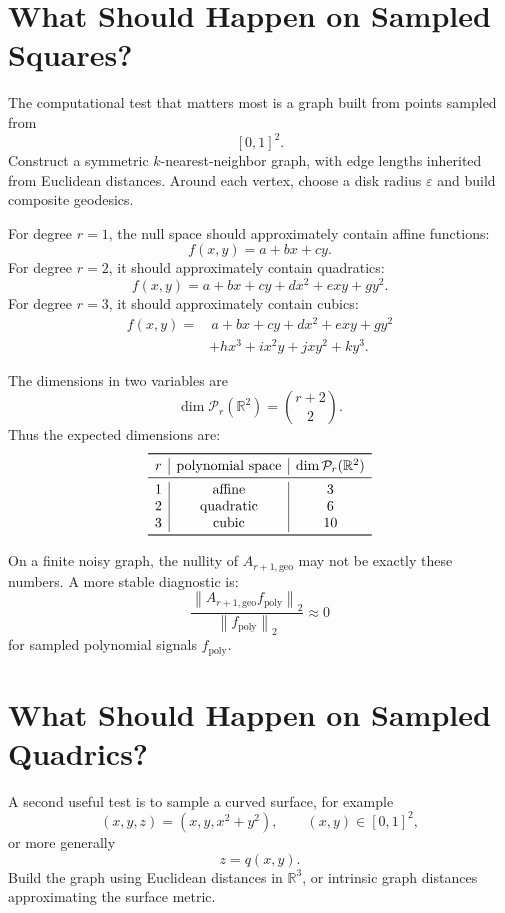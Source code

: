 \documentclass[11pt]{article}
\newcommand{\R}{\mathbb R}
\newcommand{\norm}[1]{\left\lVert #1 \right\rVert}
\newcommand{\eps}{\varepsilon}
\begin{document}
\section{What Should Happen on Sampled Squares?}

The computational test that matters most is a graph built from points sampled
from
\[
  [0,1]^2.
\]
Construct a symmetric \(k\)-nearest-neighbor graph, with edge lengths inherited
from Euclidean distances.  Around each vertex, choose a disk radius \(\eps\)
and build composite geodesics.

For degree \(r=1\), the null space should approximately contain affine
functions:
\[
  f(x,y)=a+bx+cy.
\]
For degree \(r=2\), it should approximately contain quadratics:
\[
  f(x,y)=a+bx+cy+d x^2+e xy+g y^2.
\]
For degree \(r=3\), it should approximately contain cubics:
\[
\begin{split}
  f(x,y)=&\,a+bx+cy+d x^2+e xy+g y^2\\
         &+h x^3+i x^2y+j xy^2+k y^3.
\end{split}
\]

The dimensions in two variables are
\[
  \dim \mathcal P_r(\R^2)=\binom{r+2}{2}.
\]
Thus the expected dimensions are:
\[
\begin{array}{c|c|c}
\toprule
r & \text{polynomial space} & \dim \mathcal P_r(\R^2)\\
\midrule
1 & \text{affine} & 3\\
2 & \text{quadratic} & 6\\
3 & \text{cubic} & 10\\
\bottomrule
\end{array}
\]

On a finite noisy graph, the nullity of \(A_{r+1,\mathrm{geo}}\) may not be
exactly these numbers.  A more stable diagnostic is:
\[
  \frac{\norm{A_{r+1,\mathrm{geo}}f_{\mathrm{poly}}}_2}
       {\norm{f_{\mathrm{poly}}}_2}
  \approx 0
\]
for sampled polynomial signals \(f_{\mathrm{poly}}\).

\section{What Should Happen on Sampled Quadrics?}

A second useful test is to sample a curved surface, for example
\[
  (x,y,z)=(x,y,x^2+y^2),
  \qquad (x,y)\in[0,1]^2,
\]
or more generally
\[
  z=q(x,y).
\]
Build the graph using Euclidean distances in \(\R^3\), or intrinsic graph
distances approximating the surface metric.
\end{document}
